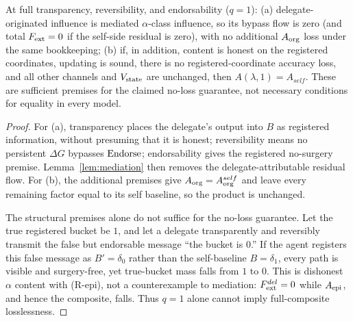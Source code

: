 \begin{theorem}
At full transparency, reversibility, and endorsability ($q=1$):
\textup{(a)} delegate-originated influence is mediated $\alpha$-class
influence, so its bypass flow is zero (and total $F_{\mathrm{ext}}=0$ if the self-side
residual is zero), with no additional $A_{\mathrm{org}}$ loss under the same
bookkeeping; \textup{(b)} if, in addition, content is honest on the
registered coordinates, updating is sound, there is no registered-coordinate
accuracy loss, and all other channels and $V_{\mathrm{state}}$ are unchanged, then
$A(\lambda,1)=A_{self}$. These are sufficient premises for the claimed
no-loss guarantee, not necessary conditions for equality in every model.
\end{theorem}
\begin{proof}
For (a), transparency places the delegate's output into $B$ as registered
information, without presuming that it is honest; reversibility means no
persistent $\Delta G$ bypasses $\mathrm{Endorse}$; endorsability gives the
registered no-surgery premise. Lemma~\ref{lem:mediation} then removes the
delegate-attributable residual flow. For (b), the additional premises give
$A_{\mathrm{org}}=A_{\mathrm{org}}^{self}$ and leave every remaining factor equal to its self
baseline, so the product is unchanged.

The structural premises alone do not suffice for the no-loss guarantee. Let
the true registered bucket be $1$,
and let a delegate transparently and reversibly transmit the false but
endorsable message ``the bucket is $0$.'' If the agent registers this false
message as $B'=\delta_0$ rather than the self-baseline
$B=\delta_1$, every path is visible and surgery-free, yet true-bucket mass
falls from $1$ to $0$. This is dishonest $\alpha$ content with (R-epi), not
a counterexample to mediation: $F_{\mathrm{ext}}^{del}=0$ while $A_{\mathrm{epi}}$, and hence the
composite, falls. Thus $q=1$ alone cannot imply full-composite
losslessness.
\end{proof}

